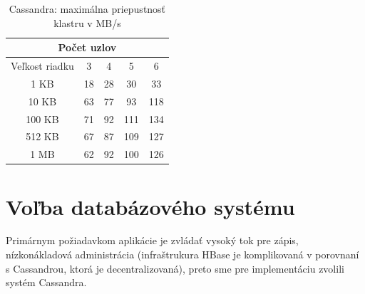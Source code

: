 \documentclass[11pt,twoside,a4paper]{book}
\begin{document}
\begin{table}[htp]
\begin{center}
\begin{tabular}{|c|c|c|c|c|}
\hline
\multicolumn{5}{|c|}{Počet uzlov}  \\
\hline Veľkost riadku & 3 & 4 & 5 & 6\\ 
\hline
\hline 1 KB & 18 & 28 & 30 & 33\\ 
\hline 10 KB & 63 & 77 & 93 & 118 \\ 
\hline 100 KB & 71 & 92 & 111 & 134\\ 
\hline 512 KB & 67 & 87 & 109 & 127\\  
\hline 1 MB & 62 & 92 & 100 & 126\\ 
\hline
\end{tabular} 
\end{center}
\caption{Cassandra: maximálna priepustnosť klastru v MB/s}
\label{tab:CPerf1}
\end{table}


\section{Voľba databázového systému}

Primárnym požiadavkom aplikácie je zvládať vysoký tok pre zápis, nízkonákladová administrácia (infraštrukura HBase je komplikovaná v porovnaní s Cassandrou, ktorá je decentralizovaná), preto sme pre implementáciu zvolili systém Cassandra.

% 
% 
% 
% 
% 
% 
\end{document}
